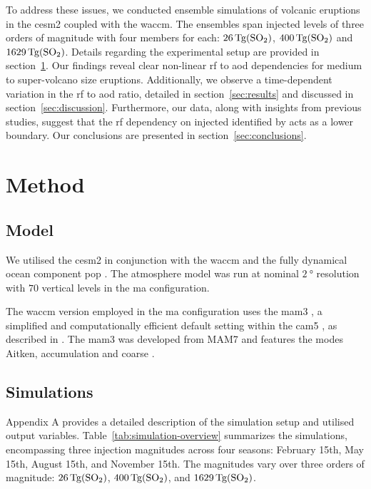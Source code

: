 \documentclass{ametsocV6.1}
\newcommand{\iso}[1][i]{{#1}njected \ce{SO2}}
\begin{document}
To address these issues, we conducted ensemble simulations of volcanic eruptions in the
\gls{cesm2} coupled with the \gls{waccm}. The ensembles span \iso{} levels of three
orders of magnitude with four members for each: \(\SI{26}{\tera\gram(\ce{SO2})}\),
\(\SI{400}{\tera\gram(\ce{SO2})}\) and \(\SI{1629}{\tera\gram(\ce{SO2})}\). Details
regarding the experimental setup are provided in section~\ref{sec:method}. Our findings
reveal clear non-linear \gls{rf} to \gls{aod} dependencies for medium to super-volcano
size eruptions. Additionally, we observe a time-dependent variation in the \gls{rf} to
\gls{aod} ratio, detailed in section~\ref{sec:results} and discussed in
section~\ref{sec:discussion}. Furthermore, our data, along with insights from previous
studies, suggest that the \gls{rf} dependency on \iso{} identified by
\citet{niemeier2015} acts as a lower boundary. Our conclusions are presented in
section~\ref{sec:conclusions}.

\section{Method}\label{sec:method}

\subsection{Model}

We utilised the \gls{cesm2} \citep{danabasoglu2020} in conjunction with the \gls{waccm}
\citep{gettleman2019} and the fully dynamical ocean component \gls{pop}
\citep{smith2010, danabasoglu2020}. The atmosphere model was run at nominal
\(\SI{2}{\degree}\) resolution with \(70\) vertical levels in the \gls{ma}
configuration.

The \gls{waccm} version employed in the \gls{ma} configuration uses the \gls{mam3}
\citep{gettleman2019}, a simplified and computationally efficient default setting within
the \gls{cam5} \citep{liu2016}, as described in \citet{liu2012}. The \gls{mam3} was
developed from MAM7 and features the modes
Aitken, accumulation and coarse \citep{liu2016}.

\subsection{Simulations}

Appendix A provides a detailed description of the simulation setup and utilised output
variables. Table~\ref{tab:simulation-overview} summarizes the simulations, encompassing
three  injection magnitudes across four seasons: February 15th, May 15th, August
15th, and November 15th. The magnitudes vary over three orders of magnitude:
\(\SI{26}{\tera\gram(\ce{SO2})}\), \(\SI{400}{\tera\gram(\ce{SO2})}\), and
\(\SI{1629}{\tera\gram(\ce{SO2})}\).
\end{document}
